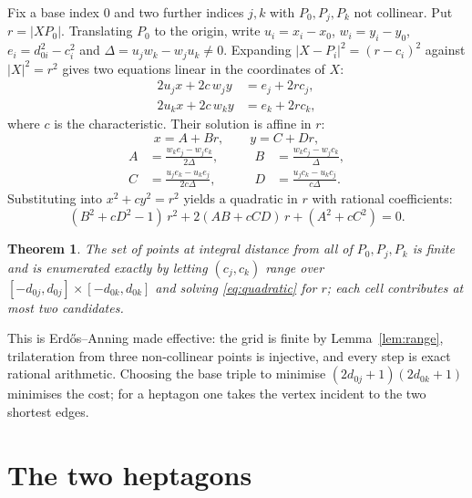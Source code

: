 \documentclass[11pt,reqno]{amsart}
\theoremstyle{plain}
\newtheorem{theorem}{Theorem}
\numberwithin{equation}{section}
\begin{document}
Fix a base index $0$ and two further indices $j,k$ with $P_0,P_j,P_k$ not collinear. Put
$r=\lvert XP_0\rvert$. Translating $P_0$ to the origin, write $u_i=x_i-x_0$, $w_i=y_i-y_0$,
$e_i=d_{0i}^2-c_i^2$ and $\Delta=u_jw_k-w_ju_k\neq 0$. Expanding $\lvert X-P_i\rvert^2=(r-c_i)^2$
against $\lvert X\rvert^2=r^2$ gives two equations linear in the coordinates of $X$:
\begin{align}
2u_j x + 2c\,w_j y &= e_j + 2rc_j,\\
2u_k x + 2c\,w_k y &= e_k + 2rc_k,
\end{align}
where $c$ is the characteristic. Their solution is affine in $r$:
\begin{equation}
x = A + Br,\qquad y = C + Dr,
\end{equation}
\begin{equation}
\begin{aligned}
A &= \frac{w_ke_j-w_je_k}{2\Delta}, &\qquad B &= \frac{w_kc_j-w_jc_k}{\Delta},\\[2pt]
C &= \frac{u_je_k-u_ke_j}{2c\Delta}, &\qquad D &= \frac{u_jc_k-u_kc_j}{c\Delta}.
\end{aligned}
\end{equation}
Substituting into $x^2+cy^2=r^2$ yields a quadratic in $r$ with rational coefficients:
\begin{equation}\label{eq:quadratic}
(B^2+cD^2-1)\,r^2 + 2(AB+cCD)\,r + (A^2+cC^2) = 0.
\end{equation}

\begin{theorem}\label{thm:method}
The set of points at integral distance from all of $P_0,P_j,P_k$ is finite and is enumerated exactly
by letting $(c_j,c_k)$ range over $[-d_{0j},d_{0j}]\times[-d_{0k},d_{0k}]$ and solving
\eqref{eq:quadratic} for $r$; each cell contributes at most two candidates.
\end{theorem}

This is Erd\H{o}s--Anning made effective: the grid is finite by Lemma~\ref{lem:range},
trilateration from three non-collinear points is injective, and every step is exact rational
arithmetic. Choosing the base triple to minimise $(2d_{0j}+1)(2d_{0k}+1)$ minimises the cost; for a
heptagon one takes the vertex incident to the two shortest edges.

\section{The two heptagons}\label{sec:heptagons}
\end{document}
